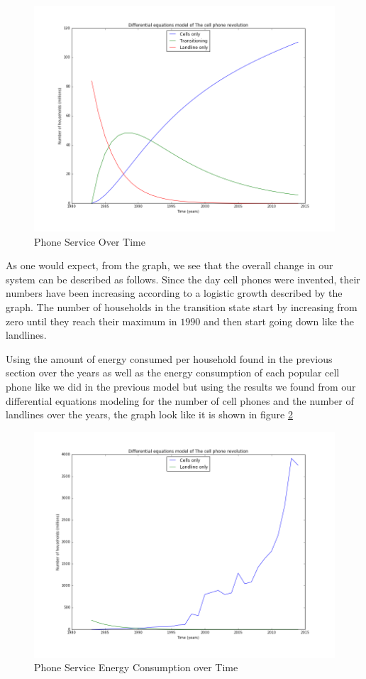 \documentclass{article}
\begin{document}
\begin{figure}
    \includegraphics[width=\textwidth]{Differential1.png} 
    \caption{Phone Service Over Time}
    \label{11}
\end{figure}

As one would expect, from the graph, we see that the overall change in our system can be described as follows. Since the day cell phones were invented, their numbers have been increasing according to a logistic growth described by the graph. The number of households in the transition state start by increasing from zero until they reach their maximum in $1990$ and then start going down like the landlines.\par 
Using the amount of energy consumed per household found in the previous section over the years as well as the energy consumption of each popular cell phone like we did in the previous model but using the results we found from our differential equations modeling for the number of cell phones and the number of landlines over the years, the graph look like it is shown in figure \ref{12}

\begin{figure}
    \centering
    \includegraphics[width=\textwidth]{Differential3.png} 
    \caption{Phone Service Energy Consumption over Time}
    \label{12}
\end{figure}
\end{document}
